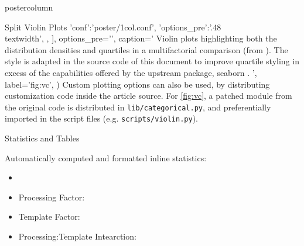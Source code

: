 \documentclass[xcolor=table]{beamer}
\begin{document}
\begin{frame}
\begin{columns}
\begin{column}{.57\textwidth}
\begin{beamercolorbox}[center]{postercolumn}
\begin{minipage}{.98\textwidth}
{\begin{myblock}{Split Violin Plots}
{{									'conf':'poster/1col.conf',
									'options_pre':'{.48\\textwidth}',
									},
								],
                                        		options_pre='\captionsetup{width=.9\linewidth}',
							caption='
								Violin plots highlighting both the distribution densities and quartiles in a multifactorial comparison (from \cite{irsabi}).
								The style is adapted in the source code of this document to improve quartile styling in excess of the capabilities offered by the upstream package, seaborn \cite{seaborn}.
								',
							label='fig:vc',
							)}
						\vspace{0.9em}
						Custom plotting options can also be used, by distributing customization code inside the article source.
						For \cref{fig:vc}, a patched module from the original code is distributed in \colorbox{elg}{\texttt{lib/categorical.py}}, and preferentially imported in the script files (e.g. \colorbox{elg}{\texttt{scripts/violin.py}}).
					\end{myblock}\vfill
					\begin{myblock}{Statistics and Tables}
						\vspace{0.3em}
						\begin{minipage}{.51\textwidth}
							Automatically computed and formatted inline statistics:
							\begin{itemize}
								\item {}
								\item Processing Factor: 
								\item Template Factor: 
								\item Processing:Template Intearction: 
							\end{itemize}
						\end{minipage}
						\begin{minipage}{.46\textwidth}
							\begin{table}[]
								\vspace{0.4em}
								\vspace{0.4em}
							\end{table}
						\end{minipage}
						\vspace{-1em}


\end{myblock}}
\end{minipage}
\end{beamercolorbox}
\end{column}
\end{columns}
\end{frame}
\end{document}
